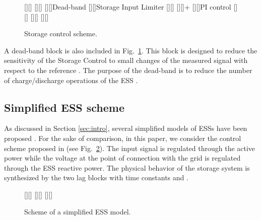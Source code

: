 \documentclass[journal, a4paper]{IEEEtran}
\begin{document}
\begin{figure}[t!]
  \begin{center}
    [][]{\LARGE }
    [][]{\huge }
    [][]{\huge Dead-band}
    [][]{\huge Storage Input Limiter}
    [][]{\huge }
    [][]{\huge+}
    \psfrag{+}{}    
    \psfrag{-}{{\large }}
    [][]{\huge PI control}    
    [][]{\huge}
    [][]{\huge}
[][]{\huge}
    \caption{Storage control scheme.}
    \label{inputsignalcontrol}
  \end{center}
\vspace{-0.4cm}
\end{figure}
A dead-band block is also included in Fig.~\ref{inputsignalcontrol}. 
This block is designed to reduce the sensitivity of the Storage
Control to small changes of the measured signal  with
respect to the reference .  The purpose of the
dead-band is to reduce the number of charge/discharge operations of
the ESS \cite{milano:13}. 

\subsection{Simplified ESS scheme}
\label{subsec:simpleESS}

As discussed in Section \ref{sec:intro}, several simplified models of
ESSs have been proposed \cite{pal:00, wu:12, sui:14, singh:13,
  fang:14}.  For the sake of comparison, in this paper, we consider
the control scheme proposed in \cite{pal:00} (see
Fig.~\ref{simplescheme}).  The input signal  is regulated
through the active power while the voltage at the point of connection
with the grid is regulated through the ESS reactive power.  The
physical behavior of the storage system is synthesized by the two lag
blocks with time constants  and .

\begin{figure}[h!]
  \begin{center}
    \psfrag{+}{\tiny{}}    
    \psfrag{-}{\tiny{}}
    [][]{}
    [][]{}
[][]{}
    \caption{Scheme of a simplified ESS model.}
    \label{simplescheme}
  \end{center}
\vspace{-0.4cm}
\end{figure}
\end{document}
